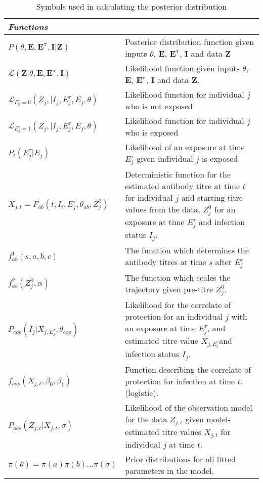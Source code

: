 \begin{table}[H]
\begin{tabular}{| l | p{} |}
       \textit{Functions} & \\
              \hline
       	$P( \theta, \mathbf{E}, \mathbf{E^\tau}, \mathbf{I}  | \mathbf{Z})$ & Posterior distribution function given inputs $\theta$, $\mathbf{E}$, $\mathbf{E^\tau}$, $\mathbf{I}$ and data $\mathbf{Z}$\\    \hline
       	$\mathcal{L}( \mathbf{Z} | \theta, \mathbf{E}, \mathbf{E^\tau}, \mathbf{I} )$ & Likelihood function given inputs $\theta$, $\mathbf{E}$, $\mathbf{E^\tau}$, $\mathbf{I}$ and data $\mathbf{Z}$. \\         \hline
        $\mathcal{L}_{E_j = 0}(Z_j, | I_j, E^\tau_j, E_j, \theta)$ & Likelihood function for individual $j$ who is not exposed \\   \hline
       	$\mathcal{L}_{E_j = 1}(Z_j, | I_j, E^\tau_j, E_j, \theta)$ & Likelihood function for individual $j$ who is exposed \\   \hline
	$P_t(E^\tau_j| E_j)$ & Likelihood of an exposure at time $E^\tau_j$ given individual $j$ is exposed  \\   \hline
	$X_{j, t} = F_{ab}( t, I_i,  E_j^\tau, \theta_{ab}, Z^0_j)$ & Deterministic function for the estimated antibody titre at time $t$ for individual $j$ and starting titre values from the data, $Z_j^0$ for an exposure at time $E_j^\tau$ and infection status $I_j$. \\   \hline
	$f^1_{ab}(s, a, b, c)$ & The function which determines the antibody titres at time $s$ after $E_j^\tau$\\  \hline 
	$f^2_{ab}(Z^0_j, \alpha)$ & The function which scales the trajectory given pre-titre $Z^0_j$. \\   \hline
	$P_{cop}(I_j | X_{j, E^\tau_j}, \theta_{cop})$ &  Likelihood for the correlate of protection for an individual $j$ with an exposure at time $E^\tau_j$, and estimated titre value $X_{j, E^\tau_j}$and infection status $I_j$.  \\   \hline
	$f_{cop}(X_{j, t},  \beta_0, \beta_1)$ & Function describing the correlate of protection for infection at time $t$. (logistic).\\  \hline
	$P_{obs}(Z_{j, t} | X_{j, t}, \sigma)$ & Likelihood of the observation model for the data $Z_{j, t}$ given model-estimated titre values $X_{j, t}$ for individual $j$ at time $t$. \\   \hline
	$\pi(\theta) = \pi(a)\pi(b)\dots\pi(\sigma)$ & Prior distributions for all fitted parameters in the model. 
         \hline
    \end{tabular}
    \caption{Symbols used in calculating the posterior distribution}
    \label{tab:ll}
\end{table}


